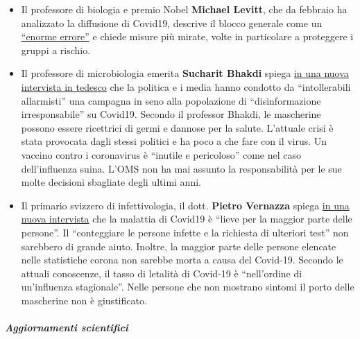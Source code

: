 \begin{itemize}
{  intervista i risultati definitivi} del suo studio sugli anticorpi.
  Streeck ha riscontrato una mortalità di Covid19 dello 0,36\%, ma
  spiega che si tratta di un limite superiore e che la mortalità è
  probabilmente compresa tra 0,24 e 0,26\% o anche meno. L'età media dei
  deceduti, positivi al test è stata di circa 81 anni.
\item
  Il professore di biologia e premio Nobel \textbf{Michael Levitt}, che
  da febbraio ha analizzato la diffusione di Covid19, descrive il blocco
  generale come un
  \href{https://www.youtube.com/watch?v=bl-sZdfLcEk}{``enorme errore''}
  e chiede misure più mirate, volte in particolare a proteggere i gruppi
  a rischio.
\item
  Il professore di microbiologia emerita \textbf{Sucharit Bhakdi} spiega
  \href{https://www.servustv.com/videos/aa-23ud73pbh1w12/}{in una nuova
  intervista in tedesco} che la politica e i media hanno condotto da
  ``intollerabili allarmisti'' una campagna in seno alla popolazione di
  ``disinformazione irresponsabile'' su Covid19. Secondo il professor
  Bhakdi, le mascherine possono essere ricettrici di germi e dannose per
  la salute. L'attuale crisi è stata provocata dagli stessi politici e
  ha poco a che fare con il virus. Un vaccino contro i coronavirus è
  ``inutile e pericoloso'' come nel caso dell'influenza suina. L'OMS non
  ha mai assunto la responsabilità per le sue molte decisioni sbagliate
  degli ultimi anni.
\item
  Il primario svizzero di infettivologia, il dott. \textbf{Pietro
  Vernazza} spiega
  \href{https://swprs.files.wordpress.com/2020/05/saldo-interview-pietro-vernazza-14-04-2020.pdf}{in
  una nuova intervista} che la malattia di Covid19 è ``lieve per la
  maggior parte delle persone''. Il ``conteggiare le persone infette e
  la richiesta di ulteriori test'' non sarebbero di grande aiuto.
  Inoltre, la maggior parte delle persone elencate nelle statistiche
  corona non sarebbe morta a causa del Covid-19. Secondo le attuali
  conoscenze, il tasso di letalità di Covid-19 è ``nell'ordine di
  un'influenza stagionale''. Nelle persone che non mostrano sintomi il
  porto delle mascherine non è giustificato.
\end{itemize}

\hypertarget{aggiornamenti-scientifici}{%
\subparagraph{\texorpdfstring{\textbf{Aggiornamenti
scientifici}}{Aggiornamenti scientifici}}\label{aggiornamenti-scientifici}}

